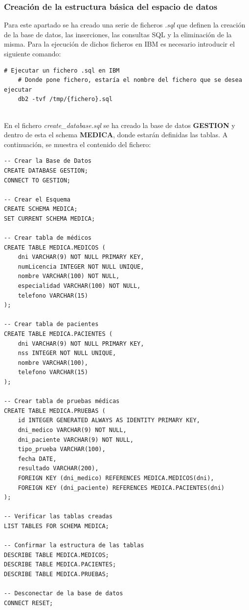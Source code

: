 \documentclass{article}
\begin{document}
\subsubsection{Creación de la estructura básica del espacio de datos}
Para este apartado se ha creado una serie de ficheros \textit{.sql} que definen la creación de la base de datos, las inserciones, las consultas SQL y la eliminación de la misma.
\newline
Para la ejecución de dichos ficheros en IBM es necesario introducir el siguiente comando:
\begin{lstlisting}[style=bashStyle]
    # Ejecutar un fichero .sql en IBM 
    # Donde pone fichero, estaría el nombre del fichero que se desea ejecutar
    db2 -tvf /tmp/{fichero}.sql
\end{lstlisting}
\\
En el fichero \textit{create\_database.sql} se ha creado la base de datos \textbf{GESTION} y dentro de esta el schema \textbf{MEDICA}, donde estarán definidas las tablas. A continuación, se muestra el contenido del fichero:
\begin{verbatim}
-- Crear la Base de Datos
CREATE DATABASE GESTION;
CONNECT TO GESTION;

-- Crear el Esquema
CREATE SCHEMA MEDICA;
SET CURRENT SCHEMA MEDICA;

-- Crear tabla de médicos
CREATE TABLE MEDICA.MEDICOS (
    dni VARCHAR(9) NOT NULL PRIMARY KEY,
    numLicencia INTEGER NOT NULL UNIQUE,
    nombre VARCHAR(100) NOT NULL,
    especialidad VARCHAR(100) NOT NULL,
    telefono VARCHAR(15)
);

-- Crear tabla de pacientes
CREATE TABLE MEDICA.PACIENTES (
    dni VARCHAR(9) NOT NULL PRIMARY KEY,
    nss INTEGER NOT NULL UNIQUE,
    nombre VARCHAR(100),
    telefono VARCHAR(15)
);

-- Crear tabla de pruebas médicas
CREATE TABLE MEDICA.PRUEBAS (
    id INTEGER GENERATED ALWAYS AS IDENTITY PRIMARY KEY,
    dni_medico VARCHAR(9) NOT NULL,
    dni_paciente VARCHAR(9) NOT NULL,
    tipo_prueba VARCHAR(100),
    fecha DATE,
    resultado VARCHAR(200),
    FOREIGN KEY (dni_medico) REFERENCES MEDICA.MEDICOS(dni),
    FOREIGN KEY (dni_paciente) REFERENCES MEDICA.PACIENTES(dni)
);

-- Verificar las tablas creadas
LIST TABLES FOR SCHEMA MEDICA;

-- Confirmar la estructura de las tablas
DESCRIBE TABLE MEDICA.MEDICOS;
DESCRIBE TABLE MEDICA.PACIENTES;
DESCRIBE TABLE MEDICA.PRUEBAS;

-- Desconectar de la base de datos
CONNECT RESET;

\end{verbatim}
\end{document}
